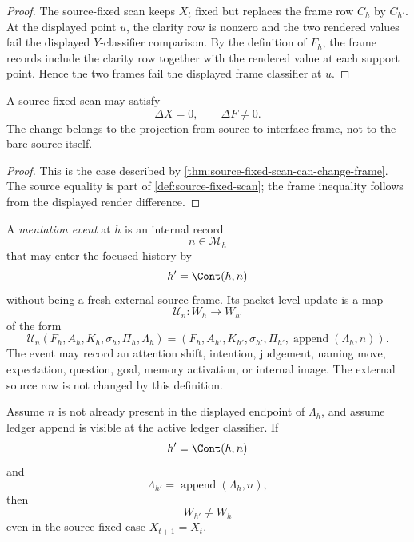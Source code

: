 \begin{proof}
The source-fixed scan keeps $X_t$ fixed but replaces the frame row
$C_h$ by $C_{h'}$. At the displayed point $u$, the clarity row is
nonzero and the two rendered values fail the displayed $Y$-classifier
comparison. By the definition of $F_h$, the frame records include the
clarity row together with the rendered value at each support point. Hence
the two frames fail the displayed frame classifier at $u$.
\end{proof}

\begin{corollary}
\label{cor:projection-change-not-source-change}
A source-fixed scan may satisfy
$$
\Delta X=0,
\qquad
\Delta F\neq 0.
$$
The change belongs to the projection from source to interface frame, not
to the bare source itself.
\end{corollary}

\begin{proof}
This is the case described by
\autoref{thm:source-fixed-scan-can-change-frame}. The source equality is
part of \autoref{def:source-fixed-scan}; the frame inequality follows
from the displayed render difference.
\end{proof}

\begin{definition}
\label{def:mentation-event}
A \emph{mentation event} at $h$ is an internal record
$$
n\in\mathcal M_h
$$
that may enter the focused history by
$$
h'=\Cont(h,n)
$$
without being a fresh external source frame. Its packet-level update is a
map
$$
\mathcal U_n:W_h\to W_{h'}
$$
of the form
$$
\mathcal U_n(F_h,A_h,K_h,\sigma_h,\Pi_h,\Lambda_h)
=
(F_h,A_{h'},K_{h'},\sigma_{h'},\Pi_{h'},
\operatorname{append}(\Lambda_h,n)).
$$
The event may record an attention shift, intention, judgement, naming
move, expectation, question, goal, memory activation, or internal image.
The external source row is not changed by this definition.
\end{definition}

\begin{theorem}
\label{thm:ledgered-mentation-changes-world-for-hist}
Assume $n$ is not already present in the displayed endpoint of
$\Lambda_h$, and assume ledger append is visible at the active ledger
classifier. If
$$
h'=\Cont(h,n)
$$
and
$$
\Lambda_{h'}=\operatorname{append}(\Lambda_h,n),
$$
then
$$
W_{h'}\neq W_h
$$
even in the source-fixed case $X_{t+1}=X_t$.
\end{theorem}

